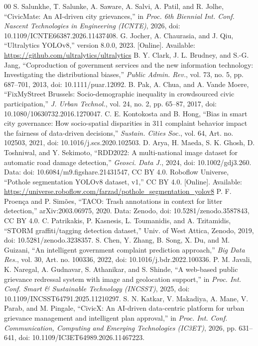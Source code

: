 \documentclass{ieeeaccess}
\begin{document}
\begin{thebibliography}{00}
 S. Salunkhe, T. Salunke, A. Saware, A. Salvi, A. Patil, and R. Jolhe, ``CivicMate: An AI-driven city grievances,'' in \textit{Proc. 6th Biennial Int. Conf. Nascent Technologies in Engineering (ICNTE)}, 2026, doi: 10.1109/ICNTE66387.2026.11437408.
 G. Jocher, A. Chaurasia, and J. Qiu, ``Ultralytics YOLOv8,'' version 8.0.0, 2023. [Online]. Available: \url{https://github.com/ultralytics/ultralytics}
 B. Y. Clark, J. L. Brudney, and S.-G. Jang, ``Coproduction of government services and the new information technology: Investigating the distributional biases,'' \textit{Public Admin. Rev.}, vol. 73, no. 5, pp. 687--701, 2013, doi: 10.1111/puar.12092.
 B. Pak, A. Chua, and A. Vande Moere, ``FixMyStreet Brussels: Socio-demographic inequality in crowdsourced civic participation,'' \textit{J. Urban Technol.}, vol. 24, no. 2, pp. 65--87, 2017, doi: 10.1080/10630732.2016.1270047.
 C. E. Kontokosta and B. Hong, ``Bias in smart city governance: How socio-spatial disparities in 311 complaint behavior impact the fairness of data-driven decisions,'' \textit{Sustain. Cities Soc.}, vol. 64, Art. no. 102503, 2021, doi: 10.1016/j.scs.2020.102503.
 D. Arya, H. Maeda, S. K. Ghosh, D. Toshniwal, and Y. Sekimoto, ``RDD2022: A multi-national image dataset for automatic road damage detection,'' \textit{Geosci. Data J.}, 2024, doi: 10.1002/gdj3.260. Data: doi: 10.6084/m9.figshare.21431547, CC BY 4.0.
 Roboflow Universe, ``Pothole segmentation YOLOv8 dataset, v1,'' CC BY 4.0. [Online]. Available: \url{https://universe.roboflow.com/farzad/pothole_segmentation_yolov8}
 P. F. Proença and P. Simões, ``TACO: Trash annotations in context for litter detection,'' arXiv:2003.06975, 2020. Data: Zenodo, doi: 10.5281/zenodo.3587843, CC BY 4.0.
 C. Patrikakis, P. Kasnesis, L. Toumanidis, and A. Tzitamidis, ``STORM graffiti/tagging detection dataset,'' Univ. of West Attica, Zenodo, 2019, doi: 10.5281/zenodo.3238357.
 S. Chen, Y. Zhang, B. Song, X. Du, and M. Guizani, ``An intelligent government complaint prediction approach,'' \textit{Big Data Res.}, vol. 30, Art. no. 100336, 2022, doi: 10.1016/j.bdr.2022.100336.
 P. M. Javali, K. Naregal, A. Gudnavar, S. Athanikar, and S. Shinde, ``A web-based public grievance redressal system with image and geolocation support,'' in \textit{Proc. Int. Conf. Smart \& Sustainable Technology (INCSST)}, 2025, doi: 10.1109/INCSST64791.2025.11210297.
 S. N. Katkar, V. Makadiya, A. Mane, V. Parab, and M. Pingale, ``CivicX: An AI-driven data-centric platform for urban grievance management and intelligent plan approval,'' in \textit{Proc. Int. Conf. Communication, Computing and Emerging Technologies (IC3ET)}, 2026, pp. 631--641, doi: 10.1109/IC3ET64989.2026.11467223.

\end{thebibliography}
\end{document}
